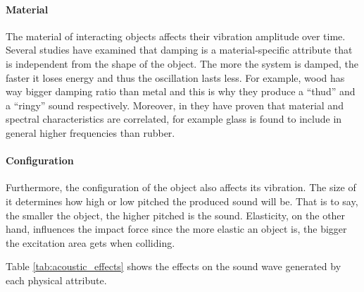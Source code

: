 \paragraph{Material}
\hfill \break

The material of interacting objects affects their vibration amplitude over time. Several studies \cite{wildes1988recovering, giordano2006material} have examined that damping is a material-specific attribute that is independent from the shape of the object. The more the system is damped, the faster it loses energy and thus the oscillation lasts less. For example, wood has way bigger damping ratio than metal and this is why they produce a ``thud'' and a ``ringy'' sound respectively. Moreover, in \cite{klatzky2000perception} they have proven that material and spectral characteristics are correlated, for example glass is found to include in general higher frequencies than rubber. 

\paragraph{Configuration}
\hfill \break

Furthermore, the configuration of the object also affects its vibration. The size of it determines how high or low pitched the produced sound will be. That is to say, the smaller the object, the higher pitched is the sound. Elasticity, on the other hand, influences the impact force since the more elastic an object is, the bigger the excitation area gets when colliding.  

Table \ref{tab:acoustic_effects} shows the effects on the sound wave generated by each physical attribute. 

